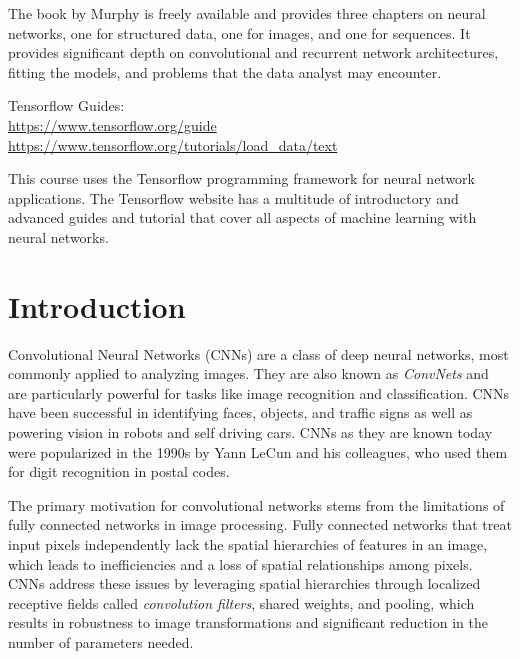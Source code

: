 The book by Murphy is freely available and provides three chapters on neural networks, one for structured data, one for images, and one for sequences. It provides significant depth on convolutional and recurrent network architectures, fitting the models, and problems that the data analyst may encounter. 

\begin{withcode}
\begin{resourcebox}
Tensorflow Guides: \\

\small\url{https://www.tensorflow.org/guide}\normalsize \\

\small\url{https://www.tensorflow.org/tutorials/load_data/text}\normalsize
\end{resourcebox}

This course uses the Tensorflow programming framework for neural network applications. The Tensorflow website has a multitude of introductory and advanced guides and tutorial that cover all aspects of machine learning with neural networks. 
\end{withcode}

\section{Introduction}

Convolutional Neural Networks (CNNs) are a class of deep neural networks, most commonly applied to analyzing images. They are also known as \emph{ConvNets} and are particularly powerful for tasks like image recognition and classification. CNNs have been successful in identifying faces, objects, and traffic signs as well as powering vision in robots and self driving cars. CNNs as they are known today were popularized in the 1990s by Yann LeCun and his colleagues, who used them for digit recognition in postal codes. 

The primary motivation for convolutional networks stems from the limitations of fully connected networks in image processing. Fully connected networks that treat input pixels independently lack the spatial hierarchies of features in an image, which leads to inefficiencies and a loss of spatial relationships among pixels. CNNs address these issues by leveraging spatial hierarchies through localized receptive fields called \emph{convolution filters}, shared weights, and pooling, which results in robustness to image transformations and significant reduction in the number of parameters needed.


